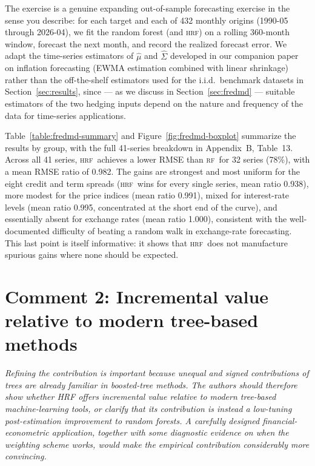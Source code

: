 \documentclass[12pt]{article}
\newcommand{\comment}[1]{\begin{refbox}\itshape #1\end{refbox}}
\newcommand{\hrf}{\textsc{hrf}}
\newcommand{\rf}{\textsc{rf}}
\begin{document}
The exercise is a genuine expanding out-of-sample forecasting exercise in
the sense you describe: for each target and each of 432 monthly origins
(1990-05 through 2026-04), we fit the random forest (and \hrf) on a rolling
360-month window, forecast the next month, and record the realized forecast
error. We adapt the time-series estimators of $\hat\mu$ and $\hat\Sigma$
developed in our companion paper on inflation forecasting
\citep{beck:wolf:hrf-inf} (EWMA estimation combined with linear shrinkage)
rather than the off-the-shelf estimators used for the i.i.d.\ benchmark
datasets in Section~\ref{sec:results}, since --- as we discuss in
Section~\ref{sec:fredmd} --- suitable estimators of the two hedging inputs
depend on the nature and frequency of the data for time-series applications.

Table~\ref{table:fredmd-summary} and Figure~\ref{fig:fredmd-boxplot}
summarize the results by group, with the full 41-series breakdown in
Appendix~B, Table~13. Across all 41 series, \hrf\ achieves a lower RMSE than
\rf\ for 32 series (78\%), with a mean RMSE ratio of 0.982. The gains are
strongest and most uniform for the eight credit and term spreads (\hrf\
wins for every single series, mean ratio 0.938), more modest for the price
indices (mean ratio 0.991), mixed for interest-rate levels (mean ratio
0.995, concentrated at the short end of the curve), and essentially absent
for exchange rates (mean ratio 1.000), consistent with the well-documented
difficulty of beating a random walk in exchange-rate forecasting. This
last point is itself informative: it shows that \hrf\ does not manufacture
spurious gains where none should be expected.

\section*{Comment 2: Incremental value relative to modern tree-based methods}

\comment{Refining the contribution is important because unequal and signed
contributions of trees are already familiar in boosted-tree methods. The
authors should therefore show whether HRF offers incremental value relative
to modern tree-based machine-learning tools, or clarify that its
contribution is instead a low-tuning post-estimation improvement to random
forests. A carefully designed financial-econometric application, together
with some diagnostic evidence on when the weighting scheme works, would
make the empirical contribution considerably more convincing.}
\end{document}
